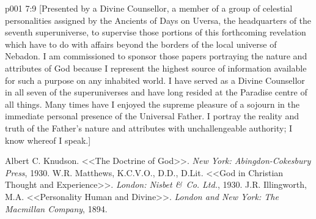 \vs p001 7:9 [Presented by a Divine Counsellor, a member of a group of celestial personalities assigned by the Ancients of Days on Uversa, the headquarters of the seventh superuniverse, to supervise those portions of this forthcoming revelation which have to do with affairs beyond the borders of the local universe of Nebadon. I am commissioned to sponsor those papers portraying the nature and attributes of God because I represent the highest source of information available for such a purpose on any inhabited world. I have served as a Divine Counsellor in all seven of the superuniverses and have long resided at the Paradise centre of all things. Many times have I enjoyed the supreme pleasure of a sojourn in the immediate personal presence of the Universal Father. I portray the reality and truth of the Father’s nature and attributes with unchallengeable authority; I know whereof I speak.]
\quizlink
\begin{thebibliography}{100}
Albert C. Knudson.
{<<The Doctrine of God>>.}
{\em New York: Abingdon-Cokesbury Press}, 1930.
W.R. Matthews, K.C.V.O., D.D., D.Lit.
{<<God in Christian Thought and Experience>>.}
{\em London: Nisbet \&\ Co. Ltd.}, 1930.
J.R. Illingworth, M.A.
{<<Personality Human and Divine>>.}
{\em London and New York: The Macmillan Company}, 1894.
\end{thebibliography}
